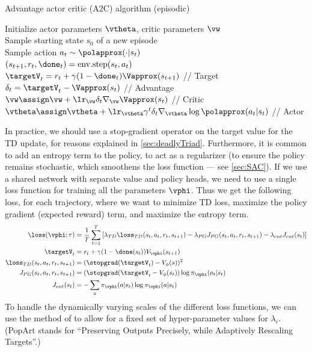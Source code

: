 

\begin{algorithm}
\dontprintsemicolon
\caption{Advantage actor critic (A2C) algorithm (episodic)}
\label{algo:A2C}
Initialize actor parameters $\vtheta$, critic parameters $\vw$\\
       {
       Sample starting state $s_0$ of a new episode \\
       {
         Sample action $a_t \sim \polapprox(\cdot|s_t)$ \\
         $(s_{t+1},r_t,\done_t) = \text{env.step}(s_t,a_t)$ \\
        $\targetV_t = r_t + \gamma (1-\done_t) \Vapprox(s_{t+1})$       // Target \\
       $\delta_t = \targetV_t - \Vapprox(s_t)$ // Advantage \\
           $\vw \assign \vw  + \lr_{\vw} \delta_t \nabla_{\vw}
       \Vapprox(s_t)$ // Critic \\
           $\vtheta \assign \vtheta + \lr_{\vtheta} \gamma^t \delta_t
       \nabla_{\vtheta} \log \polapprox(a_t|s_t)$ // Actor \\
         }
}
\end{algorithm}

In practice, we should use a stop-gradient
operator on the target value for the TD update,
for reasons  explained in \cref{sec:deadlyTriad}.
Furthermore, it is common to add an entropy term
to the policy, to act as a regularizer
(to ensure the policy remains stochastic, which smoothens
the loss function --- see \cref{sec:SAC}).
If we use a shared network with separate value  and policy heads,
we need to use a single loss function for training all the parameters
$\vphi$.
Thus we get the following loss, for each trajectory,
where we want to minimize TD loss,
maximize the policy gradient (expected reward) term,
and maximize the entropy term.
\begin{align}
  \loss(\vphi;\tau) &= \frac{1}{T} \sum_{t=1}^T \left[
    \lambda_{TD} \loss_{TD}(s_t,a_t,r_t,s_{t+1})
    -    \lambda_{PG} J_{PG}(s_t,a_t,r_t,s_{t+1})
    -    \lambda_{ent} J_{ent}(s_t)
    \right]
  \label{eqn:ACloss}\\
  \targetV_t &= r_t + \gamma (1-\done(s_t)) V_{\vphi}(s_{t+1}) \\
  \loss_{TD}(s_t,a_t,r_t,s_{t+1})  &= (\stopgrad(\targetV_t) - V_{\phi}(s))^2 \\
  J_{PG}(s_t,a_t,r_t,s_{t+1}) &= (\stopgrad(\targetV_t - V_{\phi}(s_t))
  \log \pi_{\vphi}(a_t|s_t) \\
  J_{ent}(s_t) &= -\sum_a \pi_{\vphi}(a|s_t) \log \pi_{\vphi}(a|s_t)
\end{align}
To handle the dynamically varying scales of the different loss functions,
we can use 
the  method
of \citep{van-Hasselt2016,Hessel2019}
to allow for a fixed set of hyper-parameter values for $\lambda_i$.
(PopArt  stands for
``Preserving Outputs Precisely, while Adaptively Rescaling Targets''.)

